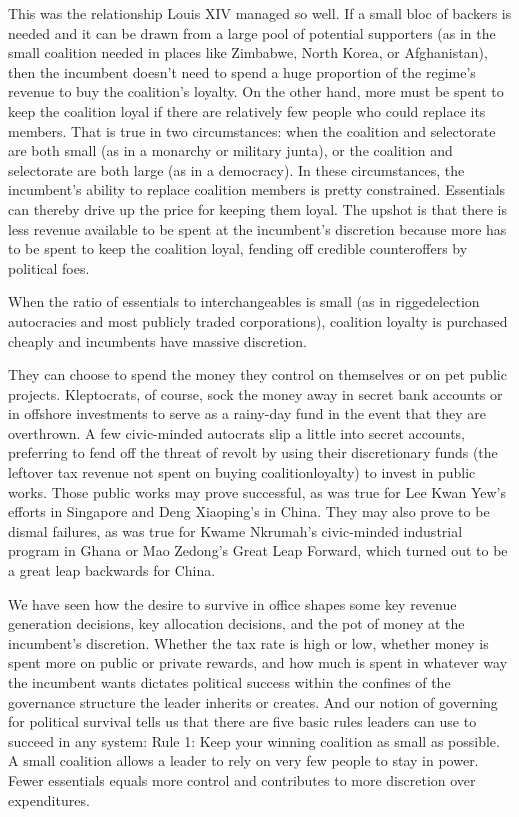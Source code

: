 \documentclass[10pt]{article}
\begin{document}
{\large This was the relationship Louis XIV managed so well. If a small bloc of
backers is needed and it can be drawn from a large pool of potential supporters
(as in the small coalition needed in places like Zimbabwe, North Korea, or
Afghanistan), then the incumbent doesn't need to spend a huge proportion of the
regime's revenue to buy the coalition's loyalty. On the other hand, more must be
spent to keep the coalition loyal if there are relatively few people who could
replace its members. That is true in two circumstances: when the coalition and
selectorate are both small (as in a monarchy or military junta), or the coalition
and selectorate are both large (as in a democracy). In these circumstances, the
incumbent's ability to replace coalition members is pretty constrained.
Essentials can thereby drive up the price for keeping them loyal. The upshot is
that there is less revenue available to be spent at the incumbent's discretion
because more has to be spent to keep the coalition loyal, fending off credible
counteroffers by political foes.}

{\large When the ratio of essentials to interchangeables is small (as in
riggedelection autocracies and most publicly traded corporations), coalition
loyalty is purchased cheaply and incumbents have massive discretion.}

{\large They can choose to spend the money they control on themselves or on pet
public projects. Kleptocrats, of course, sock the money away in secret bank
accounts or in offshore investments to serve as a rainy-day fund in the event
that they are overthrown. A few civic-minded autocrats slip a little into secret
accounts, preferring to fend off the threat of revolt by using their
discretionary funds (the leftover tax revenue not spent on buying
coalitionloyalty) to invest in public works. Those public works may prove
successful, as was true for Lee Kwan Yew's efforts in Singapore and Deng
Xiaoping's in China. They may also prove to be dismal failures, as was true for
Kwame Nkrumah's civic-minded industrial program in Ghana or Mao Zedong's Great
Leap Forward, which turned out to be a great leap backwards for China.}

{\large We have seen how the desire to survive in office shapes some key revenue
generation decisions, key allocation decisions, and the pot of money at the
incumbent's discretion. Whether the tax rate is high or low, whether money is
spent more on public or private rewards, and how much is spent in whatever way
the incumbent wants dictates political success within the confines of the
governance structure the leader inherits or creates. And our notion of governing
for political survival tells us that there are five basic rules leaders can use
to succeed in any system: Rule 1: Keep your winning coalition as small as
possible. A small coalition allows a leader to rely on very few people to stay in
power. Fewer essentials equals more control and contributes to more discretion
over expenditures.}
\end{document}
